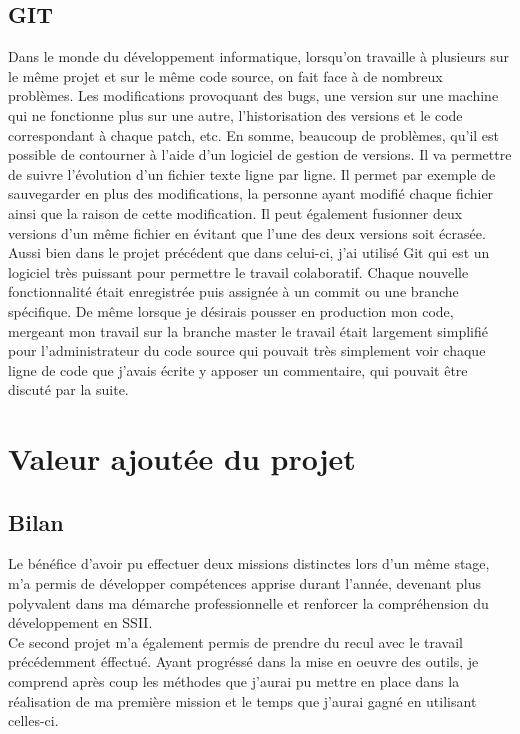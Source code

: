 \documentclass{report}
\newcommand{\jumpOne}{\\[1\baselineskip]}
\begin{document}
\subsection{GIT}
Dans le monde du développement informatique, lorsqu'on travaille à plusieurs sur le même projet et sur le même code source, on fait face à de nombreux problèmes.
Les modifications provoquant des bugs, une version sur une machine qui ne fonctionne plus sur une autre, l'historisation des versions et le code correspondant à chaque \gls{patch}, etc. En somme, beaucoup de problèmes, qu'il est possible de contourner à l'aide d'un logiciel de gestion de versions. 
Il va permettre de suivre l'évolution d'un fichier texte ligne par ligne. Il permet par exemple de sauvegarder en plus des modifications, la personne ayant modifié chaque fichier ainsi que la raison de cette modification. Il peut également fusionner deux versions d'un même fichier en évitant que l'une des deux versions soit écrasée. 
\jumpOne
Aussi bien dans le projet précédent que dans celui-ci, j'ai utilisé Git qui est un logiciel très puissant pour permettre le travail colaboratif. 
Chaque nouvelle fonctionnalité était enregistrée puis assignée à un commit ou une branche spécifique. De même lorsque je désirais pousser en production mon code, mergeant mon travail sur la branche master le travail était largement simplifié pour l'administrateur du code source qui pouvait très simplement voir chaque ligne de code que j'avais écrite y apposer un commentaire, qui pouvait être discuté par la suite.  


\section{Valeur ajoutée du projet}

\subsection{Bilan}
Le bénéfice d'avoir pu effectuer deux missions distinctes lors d'un même stage, m'a permis de développer compétences apprise durant l'année, devenant plus polyvalent dans ma démarche professionnelle et renforcer la compréhension du développement en SSII. 
\jumpOne
Ce second projet m'a également permis de prendre du recul avec le travail précédemment éffectué. Ayant progréssé dans la mise en oeuvre des outils, je comprend après coup les méthodes que j'aurai pu mettre en place dans la réalisation de ma première mission et le temps que j'aurai gagné en utilisant celles-ci. 
\end{document}
